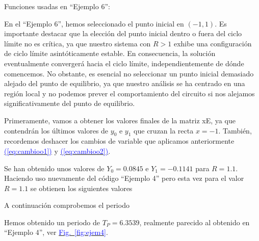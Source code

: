 \documentclass[12pt,a4paper]{report} %
\newcommand{\fref}[1]{\hyperref[#1]{\textcolor{blue}{Fig.~\ref*{#1}}}}
\newcommand{\eref}[1]{\hyperref[#1]{\textcolor{blue}{(\ref*{#1})}}}
\begin{document}
	
	
	\vspace{0.5cm}\noindent Funciones usadas en ``Ejemplo 6'':
	\vspace{0.5cm}
	\vspace{0.5cm}
	
	\newpage
	
	En el ``Ejemplo 6'', hemos seleccionado el punto inicial en $(-1,1)$. Es importante destacar que la elección del punto inicial dentro o fuera del ciclo límite no es crítica, ya que nuestro sistema con $R>1$ exhibe una configuración de ciclo límite asintóticamente estable. En consecuencia, la solución eventualmente convergerá hacia el ciclo límite, independientemente de dónde comencemos. No obstante, es esencial no seleccionar un punto inicial demasiado alejado del punto de equilibrio, ya que nuestro análisis se ha centrado en una región local y no podemos prever el comportamiento del circuito si nos alejamos significativamente del punto de equilibrio.
	
	\vspace{0.5cm}\noindent Primeramente, vamos a obtener los valores finales de la matriz xE, ya que contendrán los últimos valores de $y_0$ e $y_1$ que cruzan la recta $x=-1$. También, recordemos deshacer los cambios de variable que aplicamos anteriormente \eref{eq:cambioo1} y \eref{eq:cambioo2}.
	
	\vspace{1cm}
	
	\vspace{1cm}\noindent Se han obtenido unos valores de $Y_0=0.0845$ e $Y_1=-0.1141$ para $R=1.1$. Haciendo uso nuevamente del código ``Ejemplo 4'' pero esta vez para el valor $R=1.1$ se obtienen los siguientes valores
	
	\vspace{1cm}
	
	\newpage
	
	\vspace{0.5cm}\noindent A continuación comprobemos el periodo
	
	\vspace{1cm}
	
	\vspace{1cm}\noindent Hemos obtenido un periodo de $T_P=6.3539$, realmente parecido al obtenido en ``Ejemplo 4'', ver \fref{fig:ejem4}.
	
\end{document}
